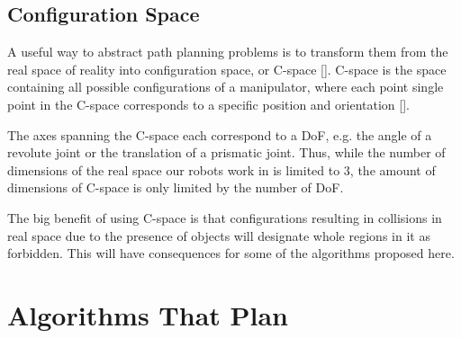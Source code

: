 %	
% 
%

\subsection{Configuration Space} \label{subsec:cspace}
	
A useful way to abstract path planning problems is to transform them from the real space of reality into configuration space, or C-space [\citeauthor{Siciliano2016}]. C-space is the space containing all possible configurations of a manipulator, where each point single point in the C-space corresponds to a specific position and orientation [\citeauthor{Lozano-perez1983}]. 

The axes spanning the C-space each correspond to a \gls{DoF}, e.g. the angle of a revolute joint or the translation of a prismatic joint.  Thus, while the number of dimensions of the real space our robots work in is limited to $3$, the amount of dimensions of C-space is only limited by the number of DoF.

The big benefit of using C-space is that configurations resulting in collisions in real space due to the presence of objects will designate whole regions in it as forbidden. This will have consequences for some of the algorithms proposed here. 



\section{Algorithms That Plan} \label{sec:planalgo}

